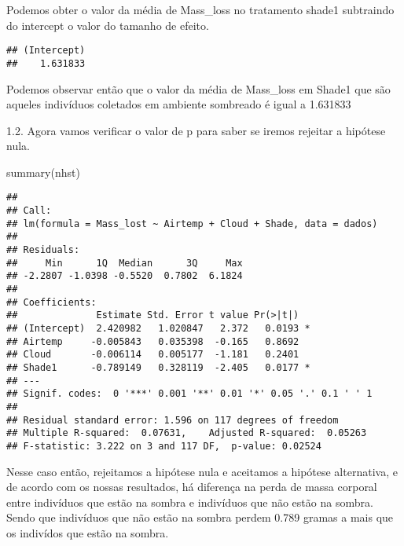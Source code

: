 \documentclass[
]{article}
\newenvironment{Shaded}{\begin{snugshade}}{\end{snugshade}}
\newcommand{\DecValTok}[1]{\textcolor[rgb]{0.00,0.00,0.81}{#1}}
\newcommand{\FunctionTok}[1]{\textcolor[rgb]{0.00,0.00,0.00}{#1}}
\newcommand{\NormalTok}[1]{#1}
\newcommand{\OtherTok}[1]{\textcolor[rgb]{0.56,0.35,0.01}{#1}}
\newcommand{\SpecialCharTok}[1]{\textcolor[rgb]{0.00,0.00,0.00}{#1}}
\begin{document}
Podemos obter o valor da média de Mass\_loss no tratamento shade1
subtraindo do intercept o valor do tamanho de efeito.

\begin{Shaded}
\end{Shaded}

\begin{verbatim}
## (Intercept) 
##    1.631833
\end{verbatim}

Podemos observar então que o valor da média de Mass\_loss em Shade1 que
são aqueles indivíduos coletados em ambiente sombreado é igual a
1.631833

1.2. Agora vamos verificar o valor de p para saber se iremos rejeitar a
hipótese nula.

\begin{Shaded}
\begin{Highlighting}[]
\FunctionTok{summary}\NormalTok{(nhst)}
\end{Highlighting}
\end{Shaded}

\begin{verbatim}
## 
## Call:
## lm(formula = Mass_lost ~ Airtemp + Cloud + Shade, data = dados)
## 
## Residuals:
##     Min      1Q  Median      3Q     Max 
## -2.2807 -1.0398 -0.5520  0.7802  6.1824 
## 
## Coefficients:
##              Estimate Std. Error t value Pr(>|t|)  
## (Intercept)  2.420982   1.020847   2.372   0.0193 *
## Airtemp     -0.005843   0.035398  -0.165   0.8692  
## Cloud       -0.006114   0.005177  -1.181   0.2401  
## Shade1      -0.789149   0.328119  -2.405   0.0177 *
## ---
## Signif. codes:  0 '***' 0.001 '**' 0.01 '*' 0.05 '.' 0.1 ' ' 1
## 
## Residual standard error: 1.596 on 117 degrees of freedom
## Multiple R-squared:  0.07631,    Adjusted R-squared:  0.05263 
## F-statistic: 3.222 on 3 and 117 DF,  p-value: 0.02524
\end{verbatim}

Nesse caso então, rejeitamos a hipótese nula e aceitamos a hipótese
alternativa, e de acordo com os nossas resultados, há diferença na perda
de massa corporal entre indivíduos que estão na sombra e indivíduos que
não estão na sombra. Sendo que indivíduos que não estão na sombra perdem
0.789 gramas a mais que os indivídos que estão na sombra.
\end{document}
